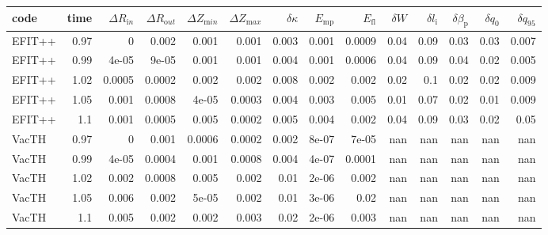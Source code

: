 \begin{table}
\centering

\begin{tabular}{lrrrrrrrrrrrrr}
\toprule
   code &  time &  $\Delta R_{\mathrm in}$ &  $\Delta R_{\mathrm out}$ &  $\Delta Z_{\mathrm min}$ &  $\Delta Z_{\mathrm max}$ &  $\delta \kappa$ &  $E_\mathrm{mp}$ &  $E_\mathrm{fl}$ &  $\delta W$ &  $\delta l_{\mathrm i}$ &  $\delta \beta_{\mathrm p}$ &  $\delta q_0$ &  $\delta q_{95}$ \\
\midrule
 EFIT++ &  0.97 &              0 &            0.002 &        0.001 &        0.001 &                  0.003 &       0.001 &      0.0009 &          0.04 &           0.09 &              0.03 &           0.03 &           0.007 \\
 EFIT++ &  0.99 &          4e-05 &            9e-05 &        0.001 &        0.001 &                  0.004 &       0.001 &      0.0006 &          0.04 &           0.09 &              0.04 &           0.02 &           0.005 \\
 EFIT++ &  1.02 &         0.0005 &           0.0002 &        0.002 &        0.002 &                  0.008 &       0.002 &       0.002 &          0.02 &            0.1 &              0.02 &           0.02 &           0.009 \\
 EFIT++ &  1.05 &          0.001 &           0.0008 &        4e-05 &       0.0003 &                  0.004 &       0.003 &       0.005 &          0.01 &           0.07 &              0.02 &           0.01 &           0.009 \\
 EFIT++ &   1.1 &          0.001 &           0.0005 &        0.005 &       0.0002 &                  0.005 &       0.004 &       0.002 &          0.04 &           0.09 &              0.03 &           0.02 &            0.05 \\
  VacTH &  0.97 &              0 &            0.001 &       0.0006 &       0.0002 &                  0.002 &       8e-07 &       7e-05 &           nan &            nan &               nan &            nan &             nan \\
  VacTH &  0.99 &          4e-05 &           0.0004 &        0.001 &       0.0008 &                  0.004 &       4e-07 &      0.0001 &           nan &            nan &               nan &            nan &             nan \\
  VacTH &  1.02 &          0.002 &           0.0008 &        0.005 &        0.002 &                   0.01 &       2e-06 &       0.002 &           nan &            nan &               nan &            nan &             nan \\
  VacTH &  1.05 &          0.006 &            0.002 &        5e-05 &        0.002 &                   0.01 &       3e-06 &        0.02 &           nan &            nan &               nan &            nan &             nan \\
  VacTH &   1.1 &          0.005 &            0.002 &        0.002 &        0.003 &                   0.02 &       2e-06 &       0.003 &           nan &            nan &               nan &            nan &             nan \\
\bottomrule
\end{tabular}


\end{table}
